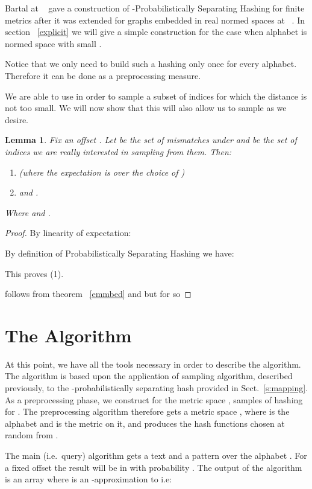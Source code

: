 \documentclass[11pt]{article}
\newtheorem{lem}[thm]{Lemma}
\begin{document}
Bartal at ~\cite{Bar96} gave a construction of -{Probabilistically Separating Hashing } for finite
metrics after it was extended for graphs embedded in real normed
spaces at ~\cite{CCGGP98}. In section ~\ref{explicit} we will give
a simple construction for the case when alphabet is normed space
 with small .

Notice that we only need to build such a hashing only once for
every alphabet. Therefore it can be done as a preprocessing
measure.



We are able to use  in order to sample a subset of indices
for which the distance is not too small. We will now show that this
will also allow us to sample  as we desire.

\begin{lem} \label{map}
Fix an offset . Let 
be the set of mismatches under  and  be the set of indices we are really
interested in sampling from them. Then:
\begin{enumerate}
\item  (where the
expectation is over the choice of )
\item  and .
\end{enumerate}
Where  and .
\end{lem}
\begin{proof}
By linearity of expectation:

By definition of Probabilistically Separating Hashing we have:

 This proves (1).

 follows from theorem ~\ref{emmbed} and
 but
 for  so

\end{proof}

\section{The Algorithm}
At this point, we have all the tools necessary in order to describe
the algorithm. The algorithm is based upon the application of
sampling algorithm, described previously,
 to the -probabilistically separating hash provided in Sect.~\ref{s:mapping}.
 As a preprocessing phase, we construct for the metric space , samples of hashing  for .
The preprocessing algorithm therefore gets a metric space
, where  is the alphabet and  is
the metric on it, and produces the
 hash
functions  chosen at random from .

The main (i.e.\ query) algorithm gets a text  and a pattern  over the alphabet
. For a fixed offset  the result will be in
 with probability
. The output of the algorithm is an array  where  is an -approximation to
 i.e:
\end{document}
